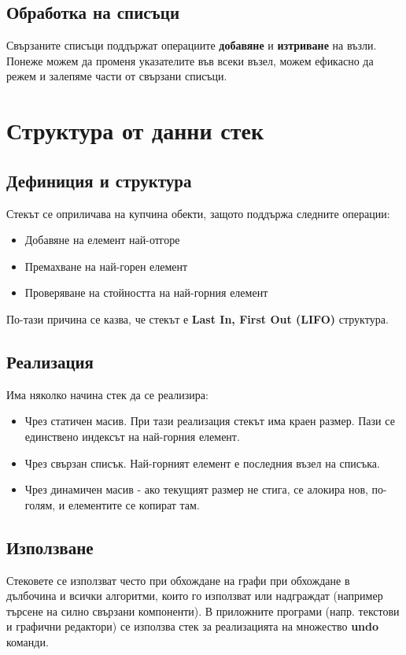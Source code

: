 \documentclass[fleqn,12pt]{article}
\begin{document}
\subsection{Обработка на списъци}
Свързаните списъци поддържат операциите \textbf{добавяне} и \textbf{изтриване} на възли.
Понеже можем да променя указателите във всеки възел, можем ефикасно да режем и залепяме части от свързани списъци. 

\section{Структура от данни стек}
\subsection{Дефиниция и структура}
Стекът се оприличава на купчина обекти, защото поддържа следните операции:
\begin{itemize}
    \item Добавяне на елемент най-отгоре
    \item Премахване на най-горен елемент
    \item Проверяване на стойността на най-горния елемент
\end{itemize}

По-тази причина се казва, че стекът е \textbf{Last In, First Out (LIFO)} структура.

\subsection{Реализация}
Има няколко начина стек да се реализира:
\begin{itemize}
    \item Чрез статичен масив. При тази реализация стекът има краен размер. Пази се единствено индексът на най-горния елемент. 
    \item Чрез свързан списък. Най-горният елемент е последния възел на списъка.
    \item Чрез динамичен масив - ако текущият размер не стига, се алокира нов, по-голям, и елементите се копират там.
\end{itemize}

\subsection{Използване}
Стековете се използват често при обхождане на графи при обхождане в дълбочина и всички алгоритми, които го използват или надграждат
(например търсене на силно свързани компоненти). В приложните програми (напр. текстови и графични редактори) се използва стек за 
реализацията на множество \textbf{undo} команди.
\end{document}
